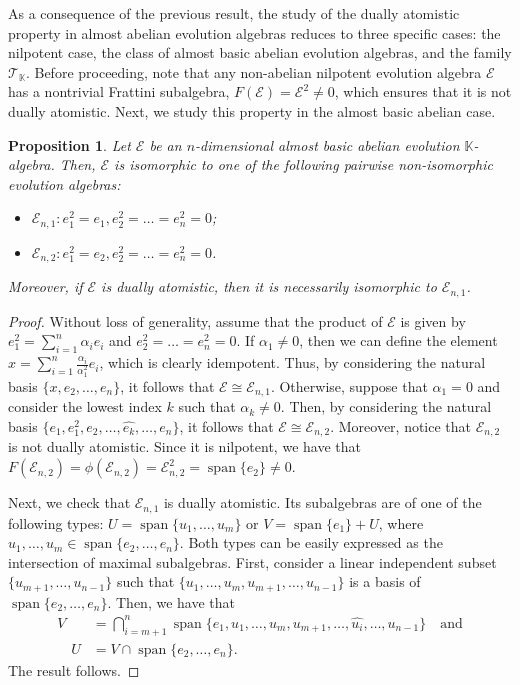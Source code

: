 \documentclass[12pt,reqno]{amsart}
\newtheorem{proposition}[theorem]{Proposition}
\theoremstyle{definition}
\theoremstyle{remark}
\DeclareMathOperator{\spa}{span}
\numberwithin{equation}{section}
\begin{document}
As a consequence of the previous result, the study of the dually atomistic property in almost abelian evolution algebras reduces to three specific cases: the nilpotent case, the class of almost basic abelian evolution algebras, and the family $\mathcal{T}_\mathbb{K}$. Before proceeding, note that any non-abelian nilpotent evolution algebra $\mathcal{E}$ has a nontrivial Frattini subalgebra, $F(\mathcal{E})=\mathcal{E}^2\neq0$, which ensures that it is not dually atomistic. Next, we study this property in the almost basic abelian case.
\begin{proposition}\label{prop:dually}
	Let $\mathcal{E}$ be an $n$-dimensional almost basic abelian evolution $\mathbb{K}$-algebra. Then, $\mathcal{E}$ is isomorphic to one of the following pairwise non-isomorphic evolution algebras:
	\begin{itemize}
		\item $\mathcal{E}_{n,1}\colon e_1^2=e_1,e_2^2=\dots=e_n^2=0$;
		\item $\mathcal{E}_{n,2}\colon e_1^2=e_2,e_2^2=\dots=e_n^2=0$.
	\end{itemize}
	Moreover, if $\mathcal{E}$ is dually atomistic, then it is necessarily isomorphic to $\mathcal{E}_{n,1}$.
\end{proposition}
\begin{proof}
	Without loss of generality, assume that the product of $\mathcal{E}$ is given by $e_1^2=\sum_{i=1}^{n}\alpha_ie_i$ and $e_2^2=\dots=e_n^2=0$. If $\alpha_1\neq0$, then we can define the element $x=\sum_{i=1}^{n}\frac{\alpha_i}{\alpha_1^2}e_i$, which is clearly idempotent. Thus, by considering the natural basis $\{x,e_2,\dots,e_n\}$, it follows that $\mathcal{E}\cong\mathcal{E}_{n,1}$. Otherwise, suppose that  $\alpha_1=0$ and consider the lowest index $k$ such that $\alpha_k\neq0$. Then, by considering the natural basis $\{e_1,e_1^2,e_2,\dots,\widehat{e_k},\dots,e_n\}$, it follows that $\mathcal{E}\cong\mathcal{E}_{n,2}$.
	Moreover, notice that $\mathcal{E}_{n,2}$ is not dually atomistic. Since it is nilpotent, we have that $F(\mathcal{E}_{n,2})=\phi(\mathcal{E}_{n,2})=\mathcal{E}_{n,2}^2=\spa\{e_2\}\neq0$.
	
	Next, we check that $\mathcal{E}_{n,1}$ is dually atomistic. Its subalgebras are of one of the following types: 
	$U=\spa\{u_1,\dots,u_m\}$ or  $V=\spa\{e_1\}+U$, where $u_1,\dots,u_m\in\spa\{e_2,\dots,e_n\}$.
	Both types can be easily expressed as the intersection of maximal subalgebras. First, consider a linear independent subset $\{u_{m+1},\dots,u_{n-1}\}$ such that $\{u_1,\dots,u_m,u_{m+1},\dots,u_{n-1}\}$ is a basis of $\spa\{e_2,\dots,e_n\}$. Then, we have that
	\begin{align*}
		V&=\bigcap_{i=m+1}^n\spa\{e_1,u_1,\dots,u_m,u_{m+1},\dots,\widehat{u_i},\dots,u_{n-1}\}\quad\text{and}\\\quad
		U&=V\cap\spa\{e_2,\dots,e_n\}.
	\end{align*}
	The result follows.
\end{proof}
\end{document}
